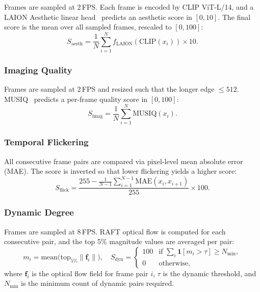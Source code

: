 Frames are sampled at 2\,FPS. Each frame is encoded by CLIP ViT-L/14, and a LAION Aesthetic linear head~\cite{schuhmann2022laion5b} predicts an aesthetic score in $[0, 10]$. The final score is the mean over all sampled frames, rescaled to $[0, 100]$:
\begin{equation}
  S_{\text{aesth}} = \frac{1}{N}\sum_{i=1}^{N} f_{\text{LAION}}(\text{CLIP}(x_i)) \times 10.
\end{equation}

\subsubsection{Imaging Quality}
\label{app:imaging_detail}

Frames are sampled at 2\,FPS and resized such that the longer edge $\leq 512$. MUSIQ~\cite{ke2021musiq} predicts a per-frame quality score in $[0, 100]$:
\begin{equation}
  S_{\text{imag}} = \frac{1}{N}\sum_{i=1}^{N} \text{MUSIQ}(x_i).
\end{equation}

\subsubsection{Temporal Flickering}
\label{app:flickering_detail}

All consecutive frame pairs are compared via pixel-level mean absolute error (MAE). The score is inverted so that lower flickering yields a higher score:
\begin{equation}
  S_{\text{flick}} = \frac{255 - \frac{1}{N-1}\sum_{i=1}^{N-1}\text{MAE}(x_i, x_{i+1})}{255} \times 100.
\end{equation}

\subsubsection{Dynamic Degree}
\label{app:dynamic_detail}

Frames are sampled at 8\,FPS. RAFT optical flow is computed for each consecutive pair, and the top 5\% magnitude values are averaged per pair:
\begin{equation}
  m_i = \mathrm{mean}\!\bigl(\mathrm{top}_{5\%}\lVert \mathbf{f}_i \rVert\bigr), \quad
  S_{\mathrm{dyn}} =
  \begin{cases}
    100 & \text{if } \sum_{i} \mathbf{1}[m_i > \tau] \geq N_{\min}, \\
    0   & \text{otherwise},
  \end{cases}
\end{equation}
where $\mathbf{f}_i$ is the optical flow field for frame pair $i$, $\tau$ is the dynamic threshold, and $N_{\min}$ is the minimum count of dynamic pairs required.

